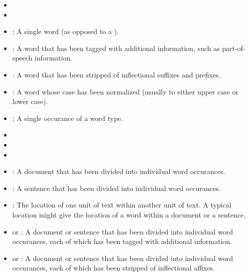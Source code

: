 \documentclass[11pt]{article}
\begin{document}
  \begin{itemize}
  
    \item {}
  
    \item {}
  
    \item {}: A single word (as opposed to a
        ).
  
    \item {}: A word that has been tagged with
        additional information, such as part-of-speech information.
  
    \item {}: A word that has been stripped of
        inflectional suffixes and prefixes.
  
    \item {}: A word whose case has been
        normalized (usually to either upper case or lower case).
  
    \item {}: A single occurance of a word type.

    \item {}
    \item {}
    \item {}
  
    \item {}: A document that has been divided
        into individual word occurances.
  
    \item {}: A sentence that has been divided
        into individual word occurances.
  
    \item {}: The location of one unit of text within
        another unit of text.  A typical location might give the
        location of a word within a document or a sentence.
  
    \item {} or : A
        document or sentence that has been divided into individual word
        occurances, each of which has been tagged with additional
        information.
  
    \item {} or : A
        document or sentence that has been divided into individual word
        occurances, each of which has been stripped of inflectional
        affixes.
  

\end{itemize}
\end{document}
